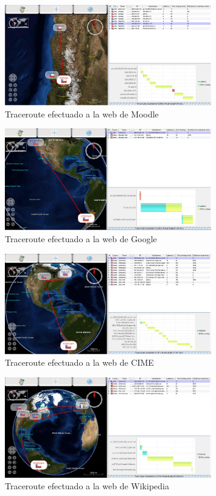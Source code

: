 \documentclass[letterpaper,10pt,onecolumn,titlepage]{article}
\begin{document}
\begin{figure}
  \centering
    \includegraphics[width=0.8\textwidth]{./3.jpg}
  \caption{Traceroute efectuado a la web de Moodle}
  \label{fig:Traceroute efectuado a la web de Moodle}
\end{figure}
\begin{figure}
  \centering
    \includegraphics[width=0.8\textwidth]{./2.jpg}
  \caption{Traceroute efectuado a la web de Google}
  \label{fig:Traceroute efectuado a la web de Google}
\end{figure}
\begin{figure}
  \centering
    \includegraphics[width=0.8\textwidth]{./1.jpg}
  \caption{Traceroute efectuado a la web de CIME}
  \label{fig:Traceroute efectuado a la web de CIME}
\end{figure}
\begin{figure}
  \centering
    \includegraphics[width=0.8\textwidth]{./5.jpg}
  \caption{Traceroute efectuado a la web de Wikipedia}
  \label{fig:Traceroute efectuado a la web de Wikipedia}
\end{figure}
\end{document}
